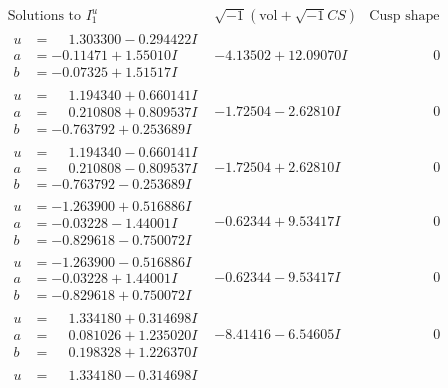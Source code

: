 \documentclass[1p]{elsarticle_modified}
\theoremstyle{definition}
\newcommand{\I}{\sqrt{-1}}
\begin{document}
$$\begin{array}{c|c|c}
\text{Solutions to }I^u_{1}& \I (\text{vol} + \sqrt{-1}CS) & \text{Cusp shape}\\
 \hline 
\begin{aligned}
u &= \phantom{-}1.303300 - 0.294422 I \\
a &= -0.11471 + 1.55010 I \\
b &= -0.07325 + 1.51517 I\end{aligned}
 & -4.13502 + 12.09070 I & \phantom{-0.000000 } 0 \\ \hline\begin{aligned}
u &= \phantom{-}1.194340 + 0.660141 I \\
a &= \phantom{-}0.210808 + 0.809537 I \\
b &= -0.763792 + 0.253689 I\end{aligned}
 & -1.72504 - 2.62810 I & \phantom{-0.000000 } 0 \\ \hline\begin{aligned}
u &= \phantom{-}1.194340 - 0.660141 I \\
a &= \phantom{-}0.210808 - 0.809537 I \\
b &= -0.763792 - 0.253689 I\end{aligned}
 & -1.72504 + 2.62810 I & \phantom{-0.000000 } 0 \\ \hline\begin{aligned}
u &= -1.263900 + 0.516886 I \\
a &= -0.03228 - 1.44001 I \\
b &= -0.829618 - 0.750072 I\end{aligned}
 & -0.62344 + 9.53417 I & \phantom{-0.000000 } 0 \\ \hline\begin{aligned}
u &= -1.263900 - 0.516886 I \\
a &= -0.03228 + 1.44001 I \\
b &= -0.829618 + 0.750072 I\end{aligned}
 & -0.62344 - 9.53417 I & \phantom{-0.000000 } 0 \\ \hline\begin{aligned}
u &= \phantom{-}1.334180 + 0.314698 I \\
a &= \phantom{-}0.081026 + 1.235020 I \\
b &= \phantom{-}0.198328 + 1.226370 I\end{aligned}
 & -8.41416 - 6.54605 I & \phantom{-0.000000 } 0 \\ \hline\begin{aligned}
u &= \phantom{-}1.334180 - 0.314698 I \\

\end{aligned}
\end{array}$$
\end{document}
